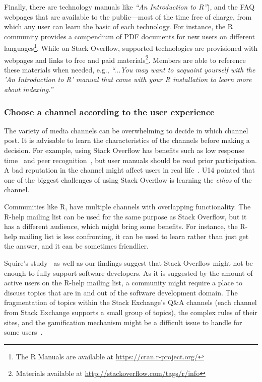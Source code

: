     Finally, there are technology manuals like \textit{``An Introduction to R''}), and the FAQ webpages that are available to the public---most of the time free of charge, from which any user can learn the basic of each technology.
    For instance, the R community provides a compendium of PDF documents for new users on different languages\footnote{The R Manuals are available at \url{https://cran.r-project.org/}}.
    While on Stack Overflow, supported technologies are provisioned with webpages and links to free and paid materials\footnote{Materials available at \url{http://stackoverflow.com/tags/r/info}}.
    Members are able to reference these materials when needed, e.g., \textit{``...You may want to acquaint yourself with the 'An Introduction to R' manual that came with your R installation to learn more about indexing.''}

\subsubsection{Choose a channel according to the user experience}
            
    The variety of media channels can be overwhelming to decide in which channel post.
    It is advisable to learn the characteristics of the channels before making a decision.
    For example, using Stack Overflow has benefits such as low response time~\cite{Mamykina2011} and peer recognition~\cite{Singer2013}, but user manuals should be read prior participation.
    A bad reputation in the channel might affect users in real life~\cite{Singer2013}.
    U14 pointed that one of the biggest challenges of using Stack Overflow is learning the \emph{ethos} of the channel.
    
    Communities like R, have multiple channels with overlapping functionality.
    The R-help mailing list can be used for the same purpose as Stack Overflow, but it has a different audience, which might bring some benefits.
    For instance, the R-help mailing list is less confronting, it can be used to learn rather than just get the answer, and it can be sometimes friendlier.
    
    Squire's study~\cite{Squire2015a} as well as our findings suggest that Stack Overflow might not be enough to fully support software developers.
    As it is suggested by the amount of active users on the R-help mailing list, a community might require a place to discuss topics that are in and out of the software development domain.
    The fragmentation of topics within the Stack Exchange's Q\&A channels (each channel from Stack Exchange supports a small group of topics), the complex rules of their sites, and the gamification mechanism might be a difficult issue to handle for some users~\cite{Vasilescu2013}.

